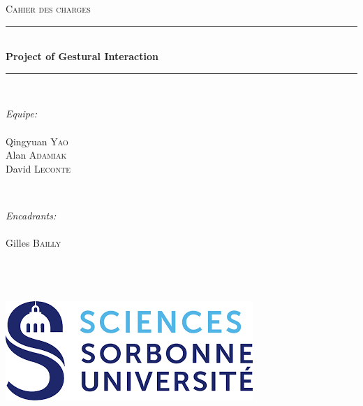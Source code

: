 \documentclass[12pt]{article}
\begin{document}
\begin{titlepage}

\newcommand{\HRule}{\rule{\linewidth}{0.5mm}} 
\center


\textsc{\Large Cahier des charges}\\[0.5cm]

\HRule \\[0.4cm]
{\huge \bfseries Project of Gestural Interaction}\\[0.4cm] 
\HRule \\[1.5cm]


\begin{minipage}{0.4\textwidth}
\begin{flushleft} \large
\emph{Equipe:}\\~\\
Qingyuan \textsc{Yao}\\
Alan \textsc{Adamiak}\\
David \textsc{Leconte}\\
\end{flushleft}
\end{minipage}
~
\begin{minipage}{0.4\textwidth}
\begin{flushright} \large
\emph{Encadrants:} \\~\\
Gilles \textsc{Bailly}\\~\\~\\
\end{flushright}
\end{minipage}\\[2cm]


\includegraphics[scale=0.5]{logo.png}\\[1cm] 

\vfill

\end{titlepage}





\newpage

\renewcommand{\contentsname}{Table of Contents}
\tableofcontents
\newpage
\end{document}
